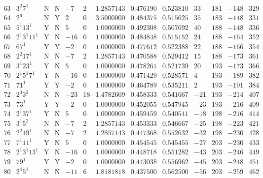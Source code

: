 \documentclass[11pt,reqno,a4letter]{article}
\numberwithin{equation}{section}
\numberwithin{figure}{section}
\numberwithin{table}{section}
\theoremstyle{plain}
\numberwithin{theorem}{section}
\theoremstyle{definition}
\begin{document}
\begin{table}[ht]
\begin{equation*}
{\begin{array}{cc|cc|ccc|cc|cccc}
 63 & 3^2 7^1 & \text{N} & \text{N} & -7 & 2 & 1.2857143 & 0.476190 & 0.523810 & 33 & 181 & -148 & 329 \\
 64 & 2^6 & \text{N} & \text{Y} & 2 & 0 & 3.5000000 & 0.484375 & 0.515625 & 35 & 183 & -148 & 331 \\
 65 & 5^1 13^1 & \text{Y} & \text{N} & 5 & 0 & 1.0000000 & 0.492308 & 0.507692 & 40 & 188 & -148 & 336 \\
 66 & 2^1 3^1 11^1 & \text{Y} & \text{N} & -16 & 0 & 1.0000000 & 0.484848 & 0.515152 & 24 & 188 & -164 & 352 \\
 67 & 67^1 & \text{Y} & \text{Y} & -2 & 0 & 1.0000000 & 0.477612 & 0.522388 & 22 & 188 & -166 & 354 \\
 68 & 2^2 17^1 & \text{N} & \text{N} & -7 & 2 & 1.2857143 & 0.470588 & 0.529412 & 15 & 188 & -173 & 361 \\
 69 & 3^1 23^1 & \text{Y} & \text{N} & 5 & 0 & 1.0000000 & 0.478261 & 0.521739 & 20 & 193 & -173 & 366 \\
 70 & 2^1 5^1 7^1 & \text{Y} & \text{N} & -16 & 0 & 1.0000000 & 0.471429 & 0.528571 & 4 & 193 & -189 & 382 \\
 71 & 71^1 & \text{Y} & \text{Y} & -2 & 0 & 1.0000000 & 0.464789 & 0.535211 & 2 & 193 & -191 & 384 \\
 72 & 2^3 3^2 & \text{N} & \text{N} & -23 & 18 & 1.4782609 & 0.458333 & 0.541667 & -21 & 193 & -214 & 407 \\
 73 & 73^1 & \text{Y} & \text{Y} & -2 & 0 & 1.0000000 & 0.452055 & 0.547945 & -23 & 193 & -216 & 409 \\
 74 & 2^1 37^1 & \text{Y} & \text{N} & 5 & 0 & 1.0000000 & 0.459459 & 0.540541 & -18 & 198 & -216 & 414 \\
 75 & 3^1 5^2 & \text{N} & \text{N} & -7 & 2 & 1.2857143 & 0.453333 & 0.546667 & -25 & 198 & -223 & 421 \\
 76 & 2^2 19^1 & \text{N} & \text{N} & -7 & 2 & 1.2857143 & 0.447368 & 0.552632 & -32 & 198 & -230 & 428 \\
 77 & 7^1 11^1 & \text{Y} & \text{N} & 5 & 0 & 1.0000000 & 0.454545 & 0.545455 & -27 & 203 & -230 & 433 \\
 78 & 2^1 3^1 13^1 & \text{Y} & \text{N} & -16 & 0 & 1.0000000 & 0.448718 & 0.551282 & -43 & 203 & -246 & 449 \\
 79 & 79^1 & \text{Y} & \text{Y} & -2 & 0 & 1.0000000 & 0.443038 & 0.556962 & -45 & 203 & -248 & 451 \\
 80 & 2^4 5^1 & \text{N} & \text{N} & -11 & 6 & 1.8181818 & 0.437500 & 0.562500 & -56 & 203 & -259 & 462 \\

\end{array}}
\end{equation*}
\end{table}
\end{document}
